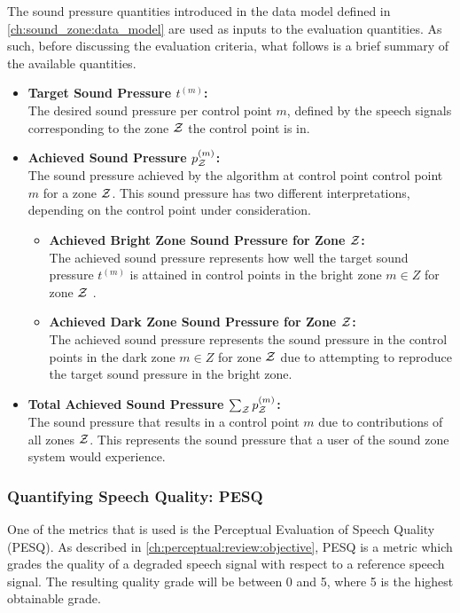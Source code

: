The sound pressure quantities introduced in the data model defined in \autoref{ch:sound_zone:data_model} are used as inputs to the evaluation quantities.
As such, before discussing the evaluation criteria, what follows is a brief summary of the available quantities.
\begin{itemize}
    \item \textbf{Target Sound Pressure $t^{(m)}$:}\\
        The desired sound pressure per control point $m$, defined by the speech signals corresponding to the zone $\mathcal{Z}$ the control point is in.
    \item \textbf{Achieved Sound Pressure $p_{\mathcal{Z}}^{(m)}$:}\\
        The sound pressure achieved by the algorithm at control point control point $m$ for a zone $\mathcal{Z}$.
        This sound pressure has two different interpretations, depending on the control point under consideration.
        \begin{itemize}
            \item \textbf{Achieved Bright Zone Sound Pressure for Zone $\mathcal{Z}$:}\\
                The achieved sound pressure represents how well the target sound pressure $t^{(m)}$ is attained in control points in the 
                bright zone $m\in Z$ for zone $\mathcal{Z}$ .
            \item \textbf{Achieved Dark Zone Sound Pressure for Zone $\mathcal{Z}$:}\\
                The achieved sound pressure represents the sound pressure in the control points in the dark zone $m\in Z$ for zone $\mathcal{Z}$  
                due to attempting to reproduce the target sound pressure in the bright zone.
        \end{itemize}
    \item \textbf{Total Achieved Sound Pressure $\sum_{\mathcal{Z}} p_{\mathcal{Z}}^{(m)}$:}\\
        The sound pressure that results in a control point $m$ due to contributions of all zones $\mathcal{Z}$.
        This represents the sound pressure that a user of the sound zone system would experience.
\end{itemize}

\subsubsection*{Quantifying Speech Quality: PESQ}
One of the metrics that is used is the Perceptual Evaluation of Speech Quality (PESQ).
As described in \autoref{ch:perceptual:review:objective}, PESQ is a metric which grades the quality of a 
degraded speech signal with respect to a reference speech signal.
The resulting quality grade will be between 0 and 5, where 5 is the highest obtainable grade.

